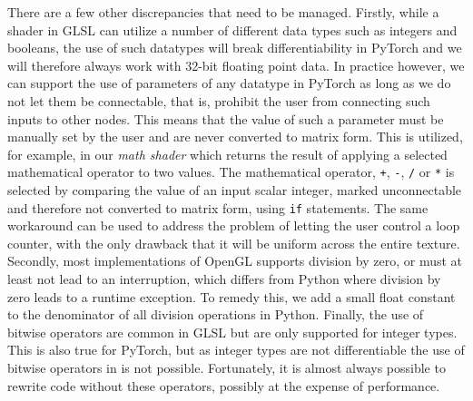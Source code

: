 There are a few other discrepancies that need to be managed. Firstly, while a shader in GLSL can utilize a number of different data types such as integers and booleans, the use of such datatypes will break differentiability in PyTorch and we will therefore always work with 32-bit floating point data. In practice however, we can support the use of parameters of any datatype in PyTorch as long as we do not let them be connectable, that is, prohibit the user from connecting such inputs to other nodes. This means that the value of such a parameter must be manually set by the user and are never converted to matrix form. This is utilized, for example, in our \textit{math shader} which returns the result of applying a selected mathematical operator to two values. The mathematical operator, \texttt{+}, \texttt{-}, \texttt{/} or \texttt{*} is selected by comparing the value of an input scalar integer, marked unconnectable and therefore not converted to matrix form, using \texttt{if} statements. The same workaround can be used to address the problem of letting the user control a loop counter, with the only drawback that it will be uniform across the entire texture. Secondly, most implementations of OpenGL supports division by zero, or must at least not lead to an interruption, which differs from Python where division by zero leads to a runtime exception. To remedy this, we add a small float constant to the denominator of all division operations in Python. Finally, the use of bitwise operators are common in GLSL but are only supported for integer types. This is also true for PyTorch, but as integer types are not differentiable the use of bitwise operators in \dipter{} is not possible. Fortunately, it is almost always possible to rewrite code without these operators, possibly at the expense of performance.




